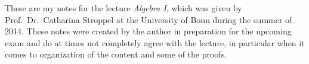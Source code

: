 \thispagestyle{plain}

These are my notes for the lecture \emph{Algebra I}, which was given by Prof.\ Dr.\ Catharina Stroppel at the University of Bonn during the summer of 2014.
These notes were created by the author in preparation for the upcoming exam and do at times not completely agree with the lecture, in particular when it comes to organization of the content and some of the proofs.
